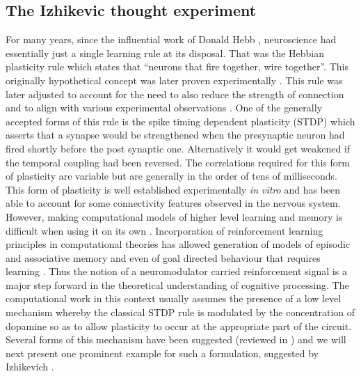     \subsection{The Izhikevic thought experiment}
    For many years, since the influential work of Donald Hebb \cite{hebb1961organization}, neuroscience had essentially just a single learning rule at its disposal. That was the Hebbian plasticity rule which states that ``neurons that fire together, wire together''. This originally hypothetical concept was later proven experimentally \cite{bliss1973long}. This rule was later adjusted to account for the need to also reduce the strength of connection and to align with various experimental observations \cite{caporale2008spike,bi1998synaptic}. One of the generally accepted forms of this rule is the spike timing dependent plasticity (STDP) which asserts that a synapse would be strengthened when the presynaptic neuron had fired shortly before the post synaptic one. Alternatively it would get weakened if the temporal coupling had been reversed. The correlations required for this form of plasticity are variable but are generally in the order of tens of milliseconds. This form of plasticity is well established experimentally \textit{in vitro} and has been able to account for some connectivity features observed in the nervous system. However, making computational models of higher level learning and memory is difficult when using it on its own \cite{brea2016does}. Incorporation of reinforcement learning principles in computational theories has allowed generation of models of episodic and associative memory \cite{brea2016does} and even of goal directed behaviour that requires learning \cite{brea2016does,fremaux2013reinforcement}. Thus the notion of a neuromodulator carried reinforcement signal is a major step forward in the theoretical understanding of cognitive processing. The computational work in this context usually assumes the presence of a low level mechanism whereby the classical STDP rule is modulated by the concentration of dopamine so as to allow plasticity to occur at the appropriate part of the circuit. Several forms of this mechanism have been suggested (reviewed in \cite{fremaux2015neuromodulated}) and we will next present one prominent example for such a formulation, suggested by Izhikevich \cite{izhikevich2007solving}.

